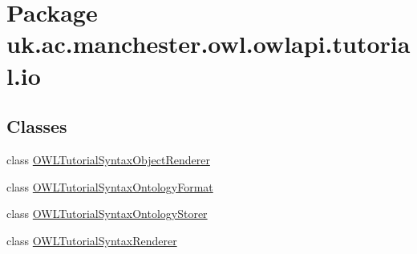 \hypertarget{namespaceuk_1_1ac_1_1manchester_1_1owl_1_1owlapi_1_1tutorial_1_1io}{\section{Package uk.\-ac.\-manchester.\-owl.\-owlapi.\-tutorial.\-io}
\label{namespaceuk_1_1ac_1_1manchester_1_1owl_1_1owlapi_1_1tutorial_1_1io}
}
\subsection*{Classes}
\begin{DoxyCompactItemize}
\item 
class \hyperlink{classuk_1_1ac_1_1manchester_1_1owl_1_1owlapi_1_1tutorial_1_1io_1_1_o_w_l_tutorial_syntax_object_renderer}{O\-W\-L\-Tutorial\-Syntax\-Object\-Renderer}
\item 
class \hyperlink{classuk_1_1ac_1_1manchester_1_1owl_1_1owlapi_1_1tutorial_1_1io_1_1_o_w_l_tutorial_syntax_ontology_format}{O\-W\-L\-Tutorial\-Syntax\-Ontology\-Format}
\item 
class \hyperlink{classuk_1_1ac_1_1manchester_1_1owl_1_1owlapi_1_1tutorial_1_1io_1_1_o_w_l_tutorial_syntax_ontology_storer}{O\-W\-L\-Tutorial\-Syntax\-Ontology\-Storer}
\item 
class \hyperlink{classuk_1_1ac_1_1manchester_1_1owl_1_1owlapi_1_1tutorial_1_1io_1_1_o_w_l_tutorial_syntax_renderer}{O\-W\-L\-Tutorial\-Syntax\-Renderer}
\end{DoxyCompactItemize}
